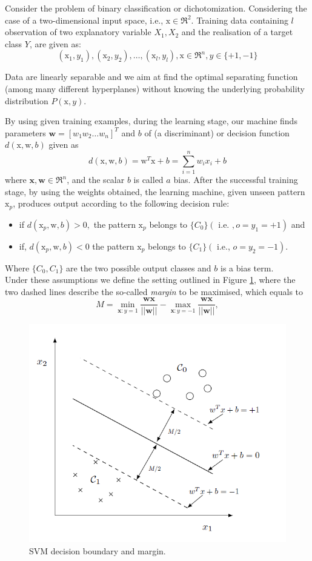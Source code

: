 \documentclass[a4,12pt]{article}
\begin{document}
Consider the problem of binary classification or dichotomization. Considering the case of a two-dimensional input space, i.e., $\mathrm{x} \in \Re^{2} .$  Training data containing $l$ observation of two explanatory variable $X_1, X_2$ and the realisation of a target class $Y$,  are given as:
$$
\left(\mathrm{x}_{1}, y_{1}\right),\left(\mathrm{x}_{2}, y_{2}\right), \ldots,\left(\mathrm{x}_{l}, y_{l}\right), \mathrm{x} \in \Re^{n}, y \in\{+1,-1\}
$$

Data are linearly separable and we aim at find the optimal separating function (among many different hyperplanes) without knowing the underlying probability distribution $P(\mathrm{x}, y) .$

By using given training examples, during the learning stage, our machine finds parameters $\mathbf{w}=\left[w_{1} w_{2} \ldots w_{n}\right]^{T}$ and $b$ of (a discriminant) or decision function $d(\mathrm{x}, \mathrm{w}, b)$ given as
$$
d(\mathrm{x}, \mathrm{w}, b)=\mathrm{w}^{T} \mathrm{x}+b=\sum_{i=1}^{n} w_{i} x_{i}+b
$$
where $\mathbf{x}, \mathbf{w} \in \Re^{n}$, and the scalar $b$ is called $a$ bias. After the successful training stage, by using the weights obtained, the learning machine, given unseen pattern $\mathrm{x}_{p}$, produces output according to the following decision rule:

\begin{itemize}
\item if $d\left(\mathrm{x}_{p}, \mathrm{w}, b\right)>0,$ the pattern $\mathrm{x}_{p}$ belongs to $\{C_0\}\left(\right.$ i.e. $\left., o=y_{1}=+1\right)$  and
\item  if, $d\left(\mathrm{x}_{p}, \mathrm{w}, b\right)<0$ the pattern $\mathrm{x}_{p}$ belongs to $\{C_1\}\left(\right.$ i.e., $\left.o=y_{2}=-1\right)$.
\end{itemize}



Where $\{C_0, C_1\}$ are the two possible output classes and $b$ is a bias term.\\ Under these assumptions we define the setting outlined in Figure \ref{fig:marginsvm}, where the two dashed lines describe the so-called \textit{margin} to be maximised, which equals to
\begin{equation}\label{eq:margin}
    M = \min_{\textbf{x}:y=1}\frac{\textbf{wx}}{||\textbf{w}||} - \max_{\textbf{x}:y=-1}\frac{\textbf{wx}}{||\textbf{w}||},
\end{equation}

\begin{figure}[h]
    \centering
\includegraphics[width=0.5\linewidth]{svm_model}
\caption{\label{fig:marginsvm} SVM decision boundary and margin.}
\end{figure}
\end{document}
